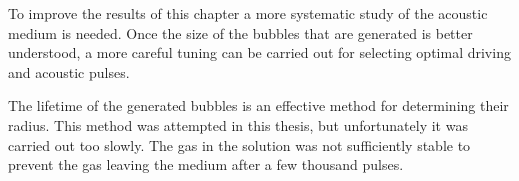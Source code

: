 To improve the results of this chapter a more
systematic study of the acoustic medium is needed.
Once the size of the bubbles that are generated is better understood,
a more careful tuning can be carried out for selecting optimal driving and acoustic pulses.

The lifetime of the generated bubbles is an effective method for determining their radius.
This method was attempted in this thesis, but unfortunately it was carried out too slowly.
The gas in the solution was not sufficiently stable to prevent the gas leaving the medium 
after a few thousand pulses.

